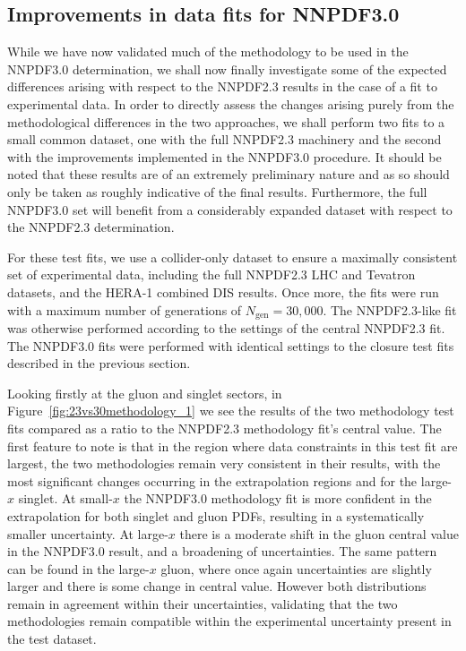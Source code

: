 \subsection{Improvements in data fits for NNPDF3.0}
While we have now validated much of the methodology to be used in the NNPDF3.0 determination, we shall now finally investigate some of the expected differences arising with respect to the NNPDF2.3 results in the case of a fit to experimental data. In order to directly assess the changes arising purely from the methodological differences in the two approaches, we shall perform two fits to a small common dataset, one with the full NNPDF2.3 machinery and the second with the improvements implemented in the NNPDF3.0 procedure. It should be noted that these results are of an extremely preliminary nature and as so should only be taken as roughly indicative of the final results. Furthermore, the full NNPDF3.0 set will benefit from a considerably expanded dataset with respect to the NNPDF2.3 determination. 

For these test fits, we use a collider-only dataset to ensure a maximally consistent set of experimental data, including the full NNPDF2.3 LHC and Tevatron datasets, and the HERA-1 combined DIS results. Once more, the fits were run with a maximum number of generations of $N_{\text{gen}} = 30,000$. The NNPDF2.3-like fit was otherwise performed according to the settings of the central NNPDF2.3 fit. The NNPDF3.0 fits were performed with identical settings to the closure test fits described in the previous section. 

Looking firstly at the gluon and singlet sectors, in Figure~\ref{fig:23vs30methodology_1} we see the results of the two methodology test fits compared as a ratio to the NNPDF2.3 methodology fit's central value. The first feature to note is that in the region where data constraints in this test fit are largest, the two methodologies remain very consistent in their results, with the most significant changes occurring in the extrapolation regions and for the large-$x$ singlet. At small-$x$ the NNPDF3.0 methodology fit is more confident in the extrapolation for both singlet and gluon PDFs, resulting in a systematically smaller uncertainty. At large-$x$ there is a moderate shift in the gluon central value in the NNPDF3.0 result, and a broadening of uncertainties. The same pattern can be found in the large-$x$ gluon, where once again uncertainties are slightly larger and there is some change in central value. However both distributions remain in agreement within their uncertainties, validating that the two methodologies remain compatible within the experimental uncertainty present in the test dataset.

